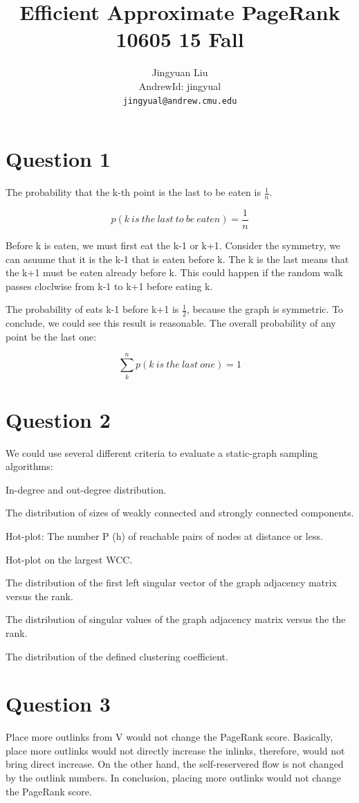 \documentclass{article} %
\title{Efficient Approximate PageRank 10605 15 Fall}
\author{
Jingyuan Liu\\
AndrewId: jingyual\\
\texttt{jingyual@andrew.cmu.edu} \\
}
\begin{document}
\maketitle



\section{Question 1}
The probability that the k-th point is the last to be eaten is $\frac{1}{n}$.

\begin{equation}
p (k \ is \ the \ last \ to \ be \ eaten) = \frac{1}{n}
\end{equation}

Before k is eaten, we must first eat the k-1 or k+1. Consider the symmetry, we
can asuume that it is the k-1 that is eaten before k. The k is the last means
that the k+1 must be eaten already before k. This could happen if the random
walk passes cloclwise from k-1 to k+1 before eating k.

The probability of eats k-1 before k+1 is $\frac{1}{2}$, because the graph is
symmetric.  To conclude, we could see this result is reasonable. The overall
probability of any point be the last one:

\begin{equation}
\sum_k^n p(k \ is \ the \ last \ one) = 1
\end{equation}


\section{Question 2}
We could use several different criteria to evaluate a static-graph sampling
algorithms:

In-degree and out-degree distribution.

The distribution of sizes of weakly connected and strongly connected components.

Hot-plot: The number P (h) of reachable pairs of nodes at distance or less.

Hot-plot on the largest WCC.

The distribution of the first left singular vector of the graph adjacency matrix
versus the rank.

The distribution of singular values of the graph adjacency matrix versus the the
rank.

The distribution of the defined clustering coefficient.


\section{Question 3}
Place more outlinks from V would not change the PageRank score. Basically, place
more outlinks would not directly increase the inlinks, therefore, would not
bring direct increase. On the other hand, the self-reservered flow is not
changed by the outlink numbers. In conclusion, placing more outlinks would not
change the PageRank score.
\end{document}
